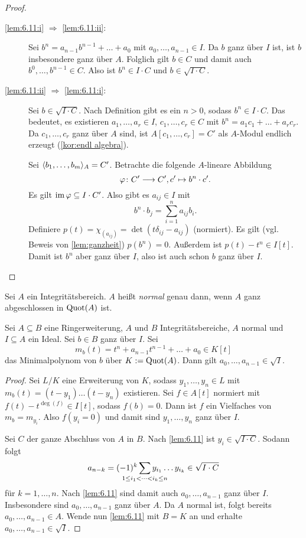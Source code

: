 \documentclass[12pt,a4paper]{scrartcl}
\theoremstyle{cplain}
\theoremstyle{cdef}
\begin{document}

\begin{proof}
	\leavevmode
	\begin{description}
		\item[\ref{lem:6.11:i} $\Rightarrow$ \ref{lem:6.11:ii}:] Sei $b^n = a_{n-1}b^{n-1}+\dots+a_0$ mit $a_0,\dots, a_{n-1}\in I$. Da $b$ ganz über $I$ ist, ist $b$ insbesondere ganz über $A$. Folglich gilt $b\in C$ und damit auch $b^0,\dots, b^{n-1}\in C$. Also ist $b^n\in I\cdot C$ und $b\in\sqrt{I\cdot C}$.
		\item[\ref{lem:6.11:ii} $\Rightarrow$ \ref{lem:6.11:i}:] Sei $b\in\sqrt{I\cdot C}$. Nach Definition gibt es ein $n>0$, sodass $b^n\in I\cdot C$. Das bedeutet, es existieren $a_1,\dots, a_r\in I$, $c_1,\dots, c_r\in C$ mit $b^n = a_1c_1+\dots+a_rc_r$. Da $c_1,\dots, c_r$ ganz über $A$ sind, ist $A[c_1,\dots, c_r] = C'$ als $A$-Modul endlich erzeugt (\cref{kor:endl algebra}).
		
		Sei $\langle b_1,\dots, b_m\rangle_A = C'$. Betrachte die folgende $A$-lineare Abbildung
		\[\varphi\colon C'\longrightarrow C', c'\mapsto b^n\cdot c'.\]
		Es gilt $\operatorname{im}\varphi\subseteq I\cdot C'$. Also gibt es $a_{ij}\in I$ mit
		\[b^n\cdot b_j = \sum_{i = 1}^{n}a_{ij}b_i .\]
		Definiere $p(t) = \chi_{(a_{ij})}= \det(t\delta_{ij}-a_{ij})$ (normiert). Es gilt (vgl. Beweis von \cref{lem:ganzheit}) $p(b^n) = 0$. Außerdem ist $p(t) -t^n \in I[t]$. Damit ist $b^n$ aber ganz über $I$, also ist auch schon $b$ ganz über $I$.
		\qedhere
	\end{description}
\end{proof}

\begin{defi}
	Sei $A$ ein Integritätsbereich. $A$ heißt \emph{normal} genau dann, wenn $A$ ganz abgeschlossen in $\operatorname{Quot}(A)$ ist.
\end{defi}
\begin{lem} \label{lem:6.13}
	Sei $A\subseteq B$ eine Ringerweiterung, $A$ und $B$ Integritätsbereiche, $A$ normal und $I\subseteq A$ ein Ideal. Sei $b\in B$ ganz über $I$. Sei
	$$m_b(t) = t^n+a_{n-1}t^{n-1}+\dots +a_0\in K[t]$$
	das Minimalpolynom von $b$ über $K := \operatorname{Quot}(A)$. Dann gilt $a_0,\dots, a_{n-1}\in\sqrt{I}$.
\end{lem}

\begin{proof}
	Sei $L/K$ eine Erweiterung von $K$, sodass $y_1,\dots, y_n\in L$ mit $m_b(t) = (t-y_1)\dots(t-y_n)$ existieren. Sei $f\in A[t]$ normiert mit $f(t) -t^{\deg(f)}\in I[t]$, sodass $f(b) = 0$. Dann ist $f$ ein Vielfaches von $m_b = m_{y_i}$. Also $f(y_i= 0)$ und damit sind $y_1,\dots, y_n$ ganz über $I$.
	
	Sei $C$ der ganze Abschluss von $A$ in $B$. Nach \cref{lem:6.11} ist $y_i\in\sqrt{I\cdot C}$.
	Sodann folgt \[a_{n-k} = (-1)^k\sum_{\mathclap{1\le i_1<\dots <i_k\le n}}y_{i_1}\dots y_{i_k}\in \sqrt{I\cdot C}\] für $k = 1,\dots, n$.
	Nach \cref{lem:6.11} sind damit auch $a_0,\dots, a_{n-1}$ ganz über $I$. Insbesondere sind $a_0,\dots, a_{n-1}$ ganz über $A$. Da $A$ normal ist, folgt bereits $a_0,\dots, a_{n-1}\in A$. Wende nun \cref{lem:6.11} mit $B = K$ an und erhalte $a_0,\dots, a_{n-1}\in \sqrt{I}$.
\end{proof}
\end{document}
